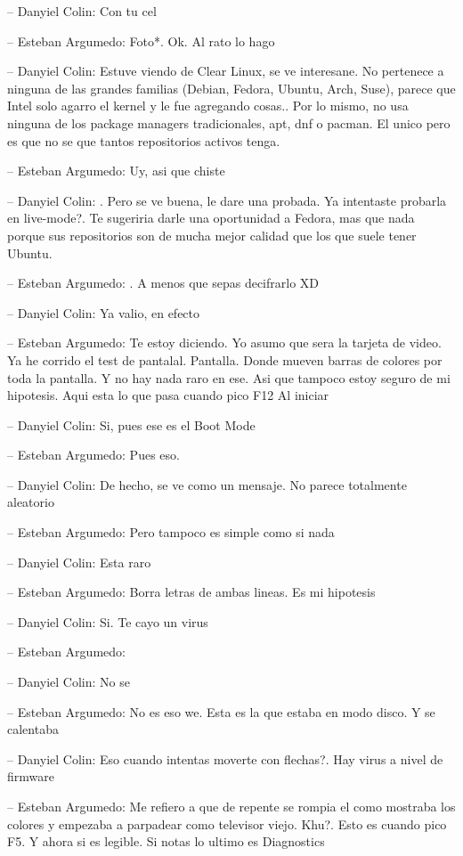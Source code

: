 -- Danyiel Colin: Con tu cel

-- Esteban Argumedo: Foto*. Ok. Al rato lo hago

-- Danyiel Colin: Estuve viendo de Clear Linux, se ve interesane. No
pertenece a ninguna de las grandes familias (Debian, Fedora, Ubuntu,
Arch, Suse), parece que Intel solo agarro el kernel y le fue agregando
cosas.. Por lo mismo, no usa ninguna de los package managers
tradicionales, apt, dnf o pacman. El unico pero es que no se que tantos
repositorios activos tenga.

-- Esteban Argumedo: Uy, asi que chiste

-- Danyiel Colin: . Pero se ve buena, le dare una probada. Ya intentaste
probarla en live-mode?. Te sugeriria darle una oportunidad a Fedora, mas
que nada porque sus repositorios son de mucha mejor calidad que los que
suele tener Ubuntu.

-- Esteban Argumedo: . A menos que sepas decifrarlo XD

-- Danyiel Colin: Ya valio, en efecto

-- Esteban Argumedo: Te estoy diciendo. Yo asumo que sera la tarjeta de
video. Ya he corrido el test de pantalal. Pantalla. Donde mueven barras
de colores por toda la pantalla. Y no hay nada raro en ese. Asi que
tampoco estoy seguro de mi hipotesis. Aqui esta lo que pasa cuando pico
F12 Al iniciar

-- Danyiel Colin: Si, pues ese es el Boot Mode

-- Esteban Argumedo: Pues eso.

-- Danyiel Colin: De hecho, se ve como un mensaje. No parece totalmente
aleatorio

-- Esteban Argumedo: Pero tampoco es simple como si nada

-- Danyiel Colin: Esta raro

-- Esteban Argumedo: Borra letras de ambas lineas. Es mi hipotesis

-- Danyiel Colin: Si. Te cayo un virus

-- Esteban Argumedo:

-- Danyiel Colin: No se

-- Esteban Argumedo: No es eso we. Esta es la que estaba en modo disco.
Y se calentaba

-- Danyiel Colin: Eso cuando intentas moverte con flechas?. Hay virus a
nivel de firmware

-- Esteban Argumedo: Me refiero a que de repente se rompia el como
mostraba los colores y empezaba a parpadear como televisor viejo. Khu?.
Esto es cuando pico F5. Y ahora si es legible. Si notas lo ultimo es
Diagnostics

